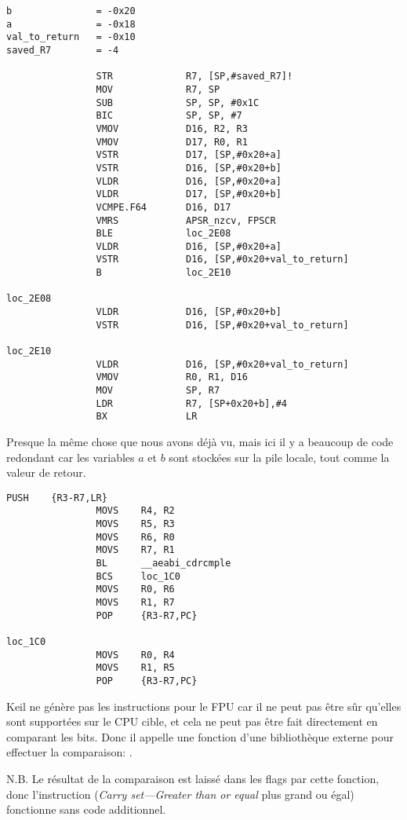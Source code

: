\myparagraph{\NonOptimizingXcodeIV (\ARMMode)}

\begin{lstlisting}[caption=\NonOptimizingXcodeIV (\ARMMode),style=customasmARM]
b               = -0x20
a               = -0x18
val_to_return   = -0x10
saved_R7        = -4

                STR             R7, [SP,#saved_R7]!
                MOV             R7, SP
                SUB             SP, SP, #0x1C
                BIC             SP, SP, #7
                VMOV            D16, R2, R3
                VMOV            D17, R0, R1
                VSTR            D17, [SP,#0x20+a]
                VSTR            D16, [SP,#0x20+b]
                VLDR            D16, [SP,#0x20+a]
                VLDR            D17, [SP,#0x20+b]
                VCMPE.F64       D16, D17
                VMRS            APSR_nzcv, FPSCR
                BLE             loc_2E08
                VLDR            D16, [SP,#0x20+a]
                VSTR            D16, [SP,#0x20+val_to_return]
                B               loc_2E10

loc_2E08
                VLDR            D16, [SP,#0x20+b]
                VSTR            D16, [SP,#0x20+val_to_return]

loc_2E10
                VLDR            D16, [SP,#0x20+val_to_return]
                VMOV            R0, R1, D16
                MOV             SP, R7
                LDR             R7, [SP+0x20+b],#4
                BX              LR
\end{lstlisting}

Presque la même chose que nous avons déjà vu, mais ici il y a beaucoup de code redondant
car les variables $a$ et $b$ sont stockées sur la pile locale, tout comme la valeur
de retour.

\myparagraph{\OptimizingKeilVI (\ThumbMode)}

\begin{lstlisting}[caption=\OptimizingKeilVI (\ThumbMode),style=customasmARM]
                PUSH    {R3-R7,LR}
                MOVS    R4, R2
                MOVS    R5, R3
                MOVS    R6, R0
                MOVS    R7, R1
                BL      __aeabi_cdrcmple
                BCS     loc_1C0
                MOVS    R0, R6
                MOVS    R1, R7
                POP     {R3-R7,PC}

loc_1C0
                MOVS    R0, R4
                MOVS    R1, R5
                POP     {R3-R7,PC}
\end{lstlisting}


Keil ne génère pas les instructions pour le FPU car il ne peut pas être sûr qu'elles
sont supportées sur le CPU cible, et cela ne peut pas être fait directement en comparant
les bits.
Donc il appelle une fonction d'une bibliothèque externe pour effectuer la comparaison:
.

N.B. Le résultat de la comparaison est laissé dans les flags par cette fonction,
donc l'instruction  (\emph{Carry set---Greater than or equal} plus grand ou
égal) fonctionne sans code additionnel.

